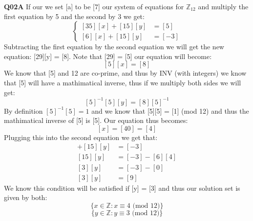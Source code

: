 \documentclass[11pt]{article}
\begin{document}
\parindent=0pt

\textbf{Q02A} If our we set [a] to be [7] our system of equations for $\mathbb Z_{12}$ and multiply the first equation by 5 and the second by 3 we get:
$$
\begin{cases}
[35][x] + [15][y] & = [5] \\
[6][x] + [15][y] & = [-3] 
\end{cases}
$$
Subtracting the first equation by the second equation we will get the new equation: [29][y] = [8]. Note that [29] = [5] our equation will become:
\[ [5][x] = [8] \]
We know that [5] and 12 are co-prime, and thus by INV (with integers) we know that [5] will have a mathimatical inverse, thus if we multiply both sides we will get:
\[ [5]^{-1}[5][y] = [8][5]^{-1} \]
By definition $[5]^{-1}[5] = 1$ and we know that [5][5] = [1] (mod 12) and thus the mathimatical inverse of [5] is [5]. Our equation thus becomes:
\[ [x] = [40] = [4] \]
Plugging this into the second equation we get that:
\begin{align*}
 [6][x] + [15][y] & = [-3]  \\
 [15][y]  & = [-3]  - [6][4] \\
 [3][y]  & = [-3]  - [0] \\
 [3][y]  & = [9]
\end{align*}
We know this condition will be satisfied if [y] = [3] and thus our solution set is given by both: 
\[  \{ x \in \mathbb{Z} : x \equiv 4 \text{  (mod 12)} \} \]
\[  \{ y \in \mathbb{Z} : y \equiv 3 \text{  (mod 12)} \} \]
\end{document}
